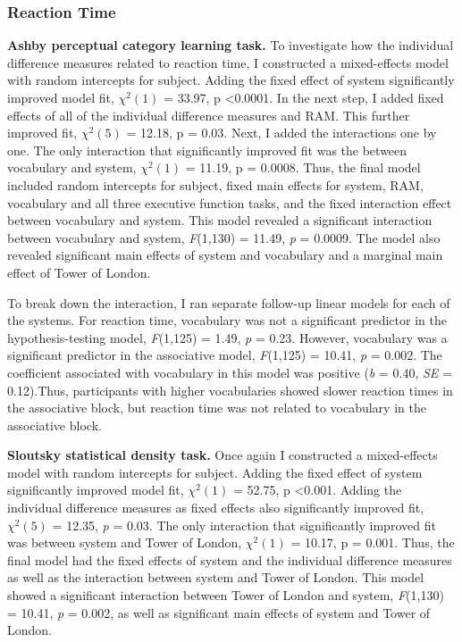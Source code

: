 \documentclass[../dissertation.tex]{subfiles}
\begin{document}
\subsubsection{Reaction Time}

\textbf{Ashby perceptual category learning task.}  To investigate how the individual difference measures related to reaction time, I constructed a mixed-effects model with random intercepts for subject. Adding the fixed effect of system significantly improved model fit,  $\chi^{2}(1)$ = 33.97, p \textless 0.0001. In the next step, I added fixed effects of all of the individual difference measures and RAM. This further improved fit, $\chi^{2}(5)$ = 12.18, p = 0.03. Next, I added the interactions one by one. The only interaction that significantly improved fit was the between vocabulary and system, $\chi^{2}(1)$ = 11.19, p = 0.0008. Thus, the final model included random intercepts for subject, fixed main effects for system, RAM, vocabulary and all three executive function tasks, and the fixed interaction effect between vocabulary and system. This model revealed a significant interaction between vocabulary and system, \textit{F}(1,130) = 11.49, \textit{p} = 0.0009. The model also revealed significant main effects of system and vocabulary and a marginal main effect of Tower of London. \par 
	To break down the interaction, I ran separate follow-up linear models for each of the systems. For reaction time, vocabulary was not a significant predictor in the hypothesis-testing model, \textit{F}(1,125) = 1.49, \textit{p} = 0.23.  However, vocabulary was a significant predictor in the associative model, \textit{F}(1,125) = 10.41, \textit{p} = 0.002. The coefficient associated with vocabulary in this model was positive (\textit{b} = 0.40, \textit{SE} = 0.12).Thus, participants with higher vocabularies showed slower reaction times in the associative block, but reaction time was not related to vocabulary in the associative block.\par 
\textbf{Sloutsky statistical density task.}  Once again I constructed a mixed-effects model with random intercepts for subject. Adding the fixed effect of system significantly improved model fit,  $\chi^{2}(1)$ = 52.75, p \textless 0.001. Adding the individual difference measures as fixed effects also significantly improved fit, $\chi^{2}(5)$ = 12.35, \textit{p} = 0.03. The only interaction that significantly improved fit was between system and Tower of London, $\chi^{2}(1)$ = 10.17, p = 0.001. Thus, the final model had the fixed effects of system and the individual difference measures as well as the interaction between system and Tower of London. This model showed a significant interaction between Tower of London and system, \textit{F}(1,130) = 10.41, \textit{p} = 0.002, as well as significant main effects of system and Tower of London. \par
\end{document}

